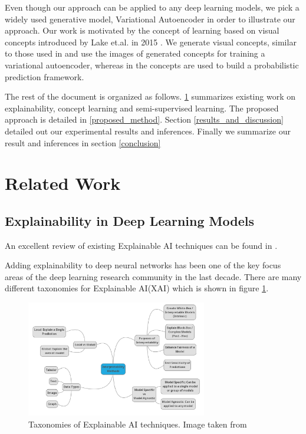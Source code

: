 \documentclass{JMLFS}
\begin{document}
Even though our approach can be applied to any deep learning models, we pick a widely used generative model, Variational Autoencoder \cite{kingma2013auto} in order to illustrate our approach.
Our work is motivated by the concept of learning based on visual concepts  introduced by Lake et.al. in 2015 \cite{lake2015}.
We generate visual concepts, similar to those used in \cite{lake2015} and use the images of generated concepts for training a variational autoencoder, whereas in \cite{lake2015} the concepts are used to build a probabilistic prediction framework.


The rest of the document is organized as follows. \ref{related_work} summarizes existing work on explainability, concept learning and semi-supervised learning.
The proposed approach is detailed in \ref{proposed_method}. Section \ref{results_and_discussion} detailed out our experimental results and inferences.
Finally we summarize our result and inferences in section \ref{conclusion}


\section{Related Work}\label{related_work}
\subsection{Explainability in Deep Learning Models}\label{lit_survey_explainability}

An excellent review of existing Explainable AI techniques can be found in \cite{linardatos2021}.

Adding explainability to deep neural networks has been one of the key focus areas of the deep learning research community in the last decade.
There are many different taxonomies for Explainable AI(XAI) which is shown in figure \ref{f:explainability_taxonomies}.
\begin{figure}
\centering
\includegraphics[height=2in]{images/explainability_taxonomies.png}
\caption{Taxonomies of Explainable AI techniques. Image taken from \cite{linardatos2021}}
\label{f:explainability_taxonomies}
\end{figure}
\end{document}
